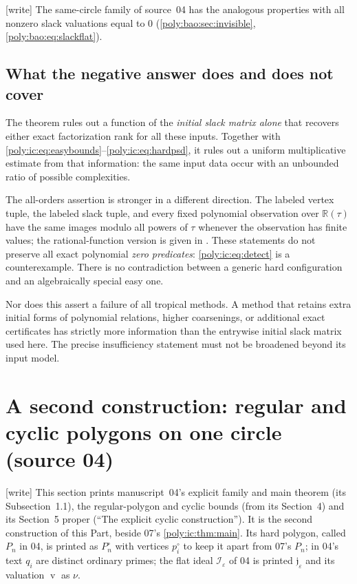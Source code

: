 \documentclass[11pt,a4paper]{article}
\numberwithin{equation}{section}
\theoremstyle{plain}
\newcommand{\wtag}{\textup{[write]}}%
\newcommand{\R}{\mathbb R}
\newcommand{\eps}{\varepsilon}
\renewcommand{\vv}{\operatorname{v}}%
\newcommand{\JJ}{\mathfrak j}
\begin{document}
\wtag{} The same-circle family of source~04 has the analogous properties
with all nonzero slack valuations equal to $0$
(\cref{poly:bao:sec:invisible}, \eqref{poly:bao:eq:slackflat}).

\subsection{What the negative answer does and does not cover}
The theorem rules out a function of the \emph{initial slack matrix alone}
that recovers either exact factorization rank for all these inputs.
Together with \eqref{poly:ic:eq:easybounds}--\eqref{poly:ic:eq:hardpsd}, it rules out a
uniform multiplicative estimate from that information: the same input
data occur with an unbounded ratio of possible complexities.

The all-orders assertion is stronger in a different direction. The
labeled vertex tuple, the labeled slack tuple, and every fixed polynomial
observation over $\R(\tau)$ have the same images modulo all powers of
$\tau$ whenever the observation has finite values; the rational-function
version is given in . These statements do not preserve
all exact polynomial \emph{zero predicates}: \eqref{poly:ic:eq:detect} is a
counterexample. There is no contradiction between a generic hard
configuration and an algebraically special easy one.

Nor does this assert a failure of all tropical methods. A method that
retains extra initial forms of polynomial relations, higher coarsenings,
or additional exact certificates has strictly more information than the
entrywise initial slack matrix used here. The precise insufficiency
statement must not be broadened beyond its input model.

\section{A second construction: regular and cyclic polygons on one circle (source 04)}\label{poly:bao:sec:construction}

\wtag{} This section prints manuscript~04's explicit family and main theorem
(its Subsection~1.1), the regular-polygon and cyclic bounds (from its
Section~4) and its Section~5 proper (``The explicit cyclic construction'').
It is the second construction of this Part, beside 07's
\cref{poly:ic:thm:main}. Its hard polygon, called $P_n$ in 04, is printed as
$P^\circ_n$ with vertices $p^\circ_i$ to keep it apart from 07's $P_n$; in
04's text $q_i$ are distinct ordinary primes; the flat ideal $\mathcal
I_\eps$ of 04 is printed $\JJ_\eps$ and its valuation $\vv$ as $\nu$.
\end{document}
